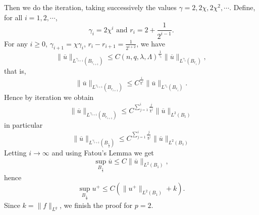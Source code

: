  Then we do the iteration, taking successively the values $\gamma=2,2\chi,2\chi^2,\cdots$. Define, for all $i=1,2,\cdots$,
 \[
 \gamma_i=2\chi^{i}\text{ and }r_i=2+\frac{1}{2^{i-1}}.
 \]
 For any $i\ge 0$, $\gamma_{i+1}=\chi\gamma_i$, $r_{i}-r_{i+1}=\frac{1}{2^{i+2}}$, we have
 \[
   \|\overline{u}\|_{L^{\gamma_{i+1}}(B_{r_{i+1}})}\le C\left( n,q,\lambda,\Lambda \right) ^{\frac{1}{\gamma_i}}\|\overline{u}\|_{L^{\gamma_i}\left( B_{r_i} \right) },
 \] 
 that is,
 \[
   \|\overline{u}\|_{L^{\gamma_{i+1}}(B_{r_{i+1}})}\le  C^{\frac{i}{\chi^{i}}}\|\overline{u}\|_{L^{\gamma_i}(B_{r_i})}.
 \] 
Hence by iteration we obtain 
\[
  \|\overline{u}\|_{L^{\gamma_{i+1}}\left( B_{r_{i+1}} \right) }\le C^{\sum_{j=1}^{i}\frac{j}{\chi^{j}}}\|\overline{u}\|_{L^{2}\left( B_1 \right) }
\] 
in particular
\[
  \|\overline{u}\|_{L^{\gamma_{i+1}}\left( B_{\frac{1}{2}} \right) }\le C^{\sum_{j=1}^{i}\frac{j}{\chi^{j}}}\|\overline{u}\|_{L^{2}\left( B_1 \right) }
\] 
Letting $i\to \infty$ and using Fatou's Lemma we get 
\[
  \sup_{B_{\frac{1}{2}}}\overline{u}\le C\|\overline{u}\|_{L^2\left( B_1 \right) },
\] 
hence
\[
  \sup_{B_{\frac{1}{2}}}u^{+}\le C\left( \|u^{+}\|_{L^2\left( B_1 \right) }+k \right). 
\] 
Since $k=\|f\|_{L^{q}}$, we finish the proof for $p=2$.
